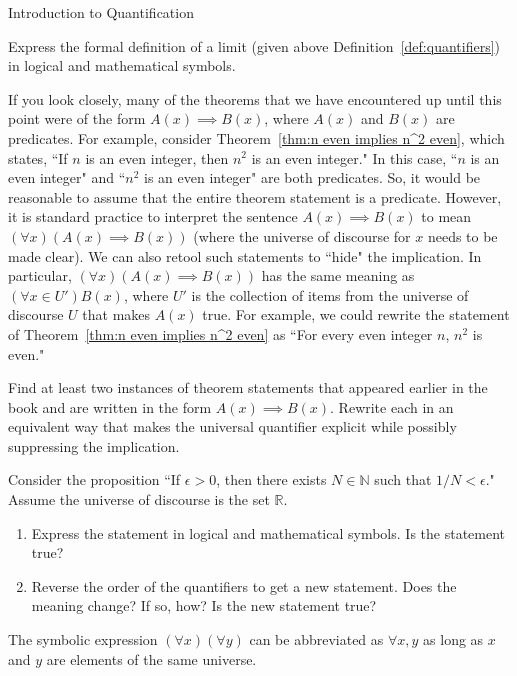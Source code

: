 \begin{section}{Introduction to Quantification}
\begin{problem}
Express the formal definition of a limit (given above Definition~\ref{def:quantifiers}) in logical and mathematical symbols.
\end{problem}

If you look closely, many of the theorems that we have encountered up until this point were of the form $A(x)\implies B(x)$, where $A(x)$ and $B(x)$ are predicates.  For example, consider Theorem~\ref{thm:n even implies n^2 even}, which states, ``If $n$ is an even integer, then $n^2$ is an even integer." In this case, ``$n$ is an even integer" and ``$n^2$ is an even integer" are both predicates.  So, it would be reasonable to assume that the entire theorem statement is a predicate.  However, it is standard practice to interpret the sentence $A(x)\implies B(x)$ to mean $(\forall x)(A(x)\implies B(x))$ (where the universe of discourse for $x$ needs to be made clear). We can also retool such statements to ``hide" the implication. In particular, $(\forall x)(A(x)\implies B(x))$ has the same meaning as $(\forall x \in U')B(x)$, where $U'$ is the collection of items from the universe of discourse $U$ that makes $A(x)$ true. For example, we could rewrite the statement of Theorem~\ref{thm:n even implies n^2 even} as ``For every even integer $n$, $n^2$ is even."

\begin{problem}
Find at least two instances of theorem statements that appeared earlier in the book and are written in the form $A(x)\implies B(x)$. Rewrite each in an equivalent way that makes the universal quantifier explicit while possibly suppressing the implication.
\end{problem}

\begin{problem}
Consider the proposition ``If $\epsilon >0$, then there exists $N\in\mathbb{N}$ such that $1/N<\epsilon$."  Assume the universe of discourse is the set $\mathbb{R}$.
\begin{enumerate}[label=\textrm{(\alph*)}]
\item Express the statement in logical and mathematical symbols. Is the statement true?
\item Reverse the order of the quantifiers to get a new statement. Does the meaning change?  If so, how?  Is the new statement true?
\end{enumerate}
\end{problem}

The symbolic expression $(\forall x)(\forall y)$ can be abbreviated as $\boxed{\forall x,y}$ as long as $x$ and $y$ are elements of the same universe.


\end{section}
